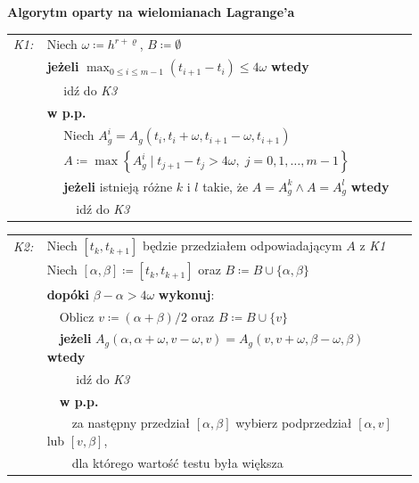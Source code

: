 \documentclass[oik, pdftex, man]{mgrwms}
\begin{document}
    \vspace{10pt}
    \begin{table}[H]
        \begin{center}
            \textbf{Algorytm oparty na wielomianach Lagrange'a}            
        \end{center}

        \begin{tabular}{p{0.045\linewidth} p{0.85\linewidth}}
            \textit{K1:}    & Niech $\omega \coloneqq h^{r+\varrho}$, $B \coloneqq \emptyset$ \\
                            & \textbf{jeżeli} \(\displaystyle \max_{0 \leq i \leq m-1} (t_{i+1} - t_{i}) \leq 4\omega \) \textbf{wtedy} \\
                            & $\quad$ idź do \textit{K3} \\
                            & \textbf{w p.p.} \\
                            & $\quad$ Niech $A_{g}^{i} = A_{g}\left(t_{i}, t_{i}+\omega, t_{i+1}-\omega, t_{i+1}\right)$ \\
                            & $\quad$ $A\coloneqq\max \left\{A_{g}^{i} \mid t_{j+1}-t_{j}>4 \omega,\; j=0,1, \ldots, m-1 \right\}$ \\
                            & $\quad$ \textbf{jeżeli} istnieją różne $k$ i $l$ takie, że $A = A_{g}^{k} \land A = A_{g}^{l}$ \textbf{wtedy} \\
                            & $\quad\quad$ idź do \textit{K3} \\
        \end{tabular}
    \end{table} \vspace{-20pt}
    \begin{table}[H]
        \begin{tabular}{p{0.045\linewidth} p{0.85\linewidth}}
        \textit{K2:}    & Niech $[t_{k}, t_{k+1}]$ będzie przedziałem odpowiadającym $A$ z \textit{K1} \\
                        & Niech $[\alpha,\beta] \coloneqq [t_{k}, t_{k+1}]$ oraz $B \coloneqq B \cup \{\alpha, \beta\}$ \\
                        & \textbf{dopóki} $\beta - \alpha > 4\omega$ \textbf{wykonuj}: \\
                        & $\quad$Oblicz $v \coloneqq (\alpha + \beta) / 2$ oraz $B \coloneqq B \cup \{v\}$ \\
                        & $\quad$\textbf{jeżeli} $A_{g}(\alpha, \alpha + \omega, v - \omega, v) = A_{g}(v, v + \omega, \beta - \omega, \beta)$ \textbf{wtedy} \\
                        & $\quad$$\quad$ idź do \textit{K3} \\
                        & $\quad$\textbf{w p.p.} \\
                        & $\quad$$\quad$za następny przedział $[\alpha, \beta]$ wybierz podprzedział $[\alpha, v]$ lub $[v, \beta]$, \\
                        & $\quad$$\quad$dla którego wartość testu była większa \\
        \end{tabular}
    \end{table} \vspace{-20pt}
\end{document}
